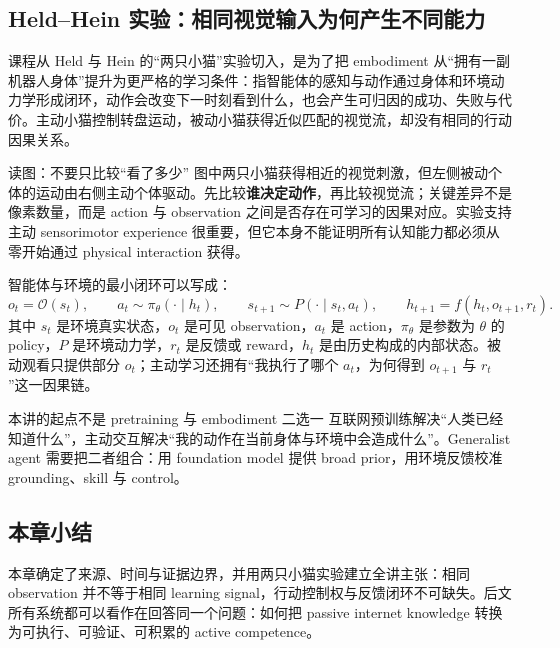 \subsection{Held--Hein 实验：相同视觉输入为何产生不同能力}

课程从 Held 与 Hein 的“两只小猫”实验切入，是为了把 embodiment 从“拥有一副机器人身体”提升为更严格的学习条件：指智能体的感知与动作通过身体和环境动力学形成闭环，动作会改变下一时刻看到什么，也会产生可归因的成功、失败与代价。主动小猫控制转盘运动，被动小猫获得近似匹配的视觉流，却没有相同的行动因果关系。


\begin{knowledgebox}{读图：不要只比较“看了多少”}
图中两只小猫获得相近的视觉刺激，但左侧被动个体的运动由右侧主动个体驱动。先比较\textbf{谁决定动作}，再比较视觉流；关键差异不是像素数量，而是 action 与 observation 之间是否存在可学习的因果对应。实验支持主动 sensorimotor experience 很重要，但它本身不能证明所有认知能力都必须从零开始通过 physical interaction 获得。
\end{knowledgebox}

智能体与环境的最小闭环可以写成：
\[
o_t = \mathcal{O}(s_t),\qquad a_t \sim \pi_\theta(\cdot\mid h_t),\qquad
s_{t+1}\sim P(\cdot\mid s_t,a_t),\qquad h_{t+1}=f(h_t,o_{t+1},r_t).
\]
其中 $s_t$ 是环境真实状态，$o_t$ 是可见 observation，$a_t$ 是 action，$\pi_\theta$ 是参数为 $\theta$ 的 policy，$P$ 是环境动力学，$r_t$ 是反馈或 reward，$h_t$ 是由历史构成的内部状态。被动观看只提供部分 $o_t$；主动学习还拥有“我执行了哪个 $a_t$，为何得到 $o_{t+1}$ 与 $r_t$”这一因果链。


\begin{importantbox}{本讲的起点不是 pretraining 与 embodiment 二选一}
互联网预训练解决“人类已经知道什么”，主动交互解决“我的动作在当前身体与环境中会造成什么”。Generalist agent 需要把二者组合：用 foundation model 提供 broad prior，用环境反馈校准 grounding、skill 与 control。
\end{importantbox}

\subsection{本章小结}

本章确定了来源、时间与证据边界，并用两只小猫实验建立全讲主张：相同 observation 并不等于相同 learning signal，行动控制权与反馈闭环不可缺失。后文所有系统都可以看作在回答同一个问题：如何把 passive internet knowledge 转换为可执行、可验证、可积累的 active competence。

